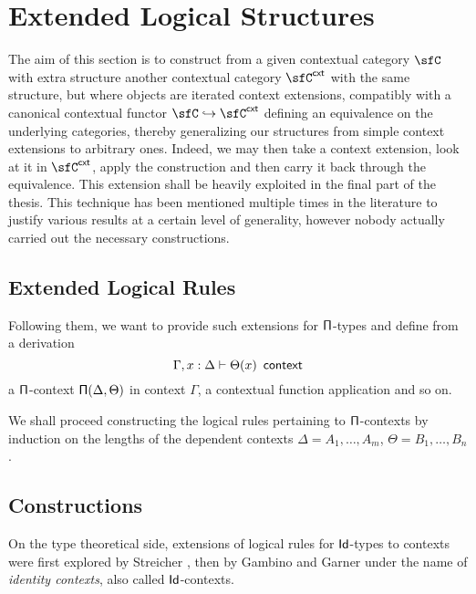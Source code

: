 \chapter{Extended Logical Structures}

The aim of this section is to construct from a given contextual category $\sfC$
with extra structure another contextual category $\sfC^{\cxt}$ with the same
structure, but where objects are iterated context extensions, compatibly with a
canonical contextual functor $\sfC\hookrightarrow\sfC^{\cxt}$ defining an
equivalence on the underlying categories, thereby
generalizing our structures from simple context extensions to arbitrary ones.
Indeed, we may then take a context extension, look at it in $\sfC^{\cxt}$, apply
the construction and then carry it back through the equivalence. This extension
shall be heavily exploited in the final part of the thesis. This technique has
been mentioned multiple times in the literature to justify various results at a
certain level of generality, however nobody actually carried out the necessary
constructions.

\section{Extended Logical Rules}


Following them,
we want to provide such extensions for $\operatorname{\mathsf{\Pi}}$-types and define from a derivation
\[\Gamma,x:\Delta\vdash\Theta(x)\operatorname{\ \mathsf{context}}\]
a $\operatorname{\mathsf{\Pi}}$-context $\operatorname{\mathsf{\Pi}}(\Delta,\Theta)$ in context $\Gamma$, a contextual
function application and so on.


We shall proceed constructing the logical rules pertaining to $\operatorname{\mathsf{\Pi}}$-contexts by
induction on the lengths of the dependent contexts $\Delta=A_1,\ldots,A_m$,
$\Theta=B_1,\ldots,B_n$.

\section{Constructions}

On the type theoretical side, extensions of logical rules for $\operatorname{\mathsf{Id}}$-types to
contexts were first explored by Streicher \cite{Str93}, then by Gambino and
Garner \cite{GG08} under the name of \emph{identity contexts}, also called
$\operatorname{\mathsf{Id}}$-contexts.

